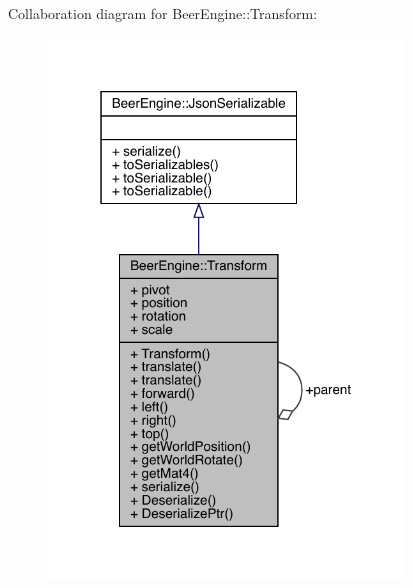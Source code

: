 Collaboration diagram for Beer\+Engine\+:\+:Transform\+:\nopagebreak
\begin{figure}[H]
\begin{center}
\leavevmode
\includegraphics[width=268pt]{class_beer_engine_1_1_transform__coll__graph}
\end{center}
\end{figure}
